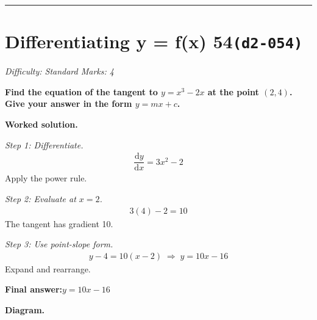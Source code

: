 \documentclass[11pt]{article}
\newcommand{\question}[1]{\par\medskip\noindent\textbf{#1}\par}
\begin{document}
\medskip\hrule

\section*{Differentiating y = f(x) 54\quad\small\texttt{(d2-054)}}
\textit{Difficulty: Standard \quad\textbar\quad Marks: 4}

\question{Find the equation of the tangent to \( y = x^3 - 2x \) at the point \( (2, 4) \). Give your answer in the form \( y = mx + c \).}

\textbf{Worked solution.}

\textit{Step 1: Differentiate.}
\[\begin{gathered}
\dfrac{\mathrm{d}y}{\mathrm{d}x} = 3x^2 - 2
\end{gathered}\]
Apply the power rule.

\textit{Step 2: Evaluate at \( x = 2 \).}
\[\begin{gathered}
3(4) - 2 = 10
\end{gathered}\]
The tangent has gradient 10.

\textit{Step 3: Use point-slope form.}
\[\begin{gathered}
y - 4 = 10(x - 2) \;\Rightarrow\; y = 10x - 16
\end{gathered}\]
Expand and rearrange.

\begin{answerbox}
\textbf{Final answer:}\quad \(\displaystyle  y = 10x - 16 \)
\end{answerbox}
\textbf{Diagram.}
\end{document}
